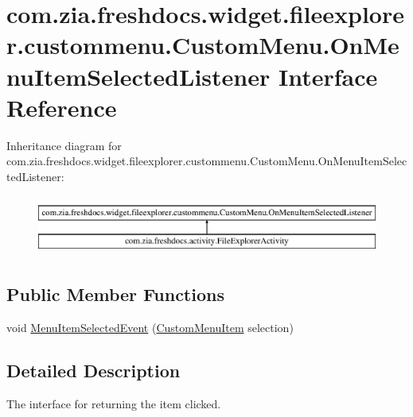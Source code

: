 \hypertarget{interfacecom_1_1zia_1_1freshdocs_1_1widget_1_1fileexplorer_1_1custommenu_1_1_custom_menu_1_1_on_menu_item_selected_listener}{\section{com.\-zia.\-freshdocs.\-widget.\-fileexplorer.\-custommenu.\-Custom\-Menu.\-On\-Menu\-Item\-Selected\-Listener Interface Reference}
\label{interfacecom_1_1zia_1_1freshdocs_1_1widget_1_1fileexplorer_1_1custommenu_1_1_custom_menu_1_1_on_menu_item_selected_listener}
}
Inheritance diagram for com.\-zia.\-freshdocs.\-widget.\-fileexplorer.\-custommenu.\-Custom\-Menu.\-On\-Menu\-Item\-Selected\-Listener\-:\begin{figure}[H]
\begin{center}
\leavevmode
\includegraphics[height=2.000000cm]{interfacecom_1_1zia_1_1freshdocs_1_1widget_1_1fileexplorer_1_1custommenu_1_1_custom_menu_1_1_on_menu_item_selected_listener}
\end{center}
\end{figure}
\subsection*{Public Member Functions}
\begin{DoxyCompactItemize}
\item 
void \hyperlink{interfacecom_1_1zia_1_1freshdocs_1_1widget_1_1fileexplorer_1_1custommenu_1_1_custom_menu_1_1_on_menu_item_selected_listener_a41e3410c814fafa6ecdba9a22c94b9de}{Menu\-Item\-Selected\-Event} (\hyperlink{classcom_1_1zia_1_1freshdocs_1_1widget_1_1fileexplorer_1_1custommenu_1_1_custom_menu_item}{Custom\-Menu\-Item} selection)
\end{DoxyCompactItemize}


\subsection{Detailed Description}
The interface for returning the item clicked. 

